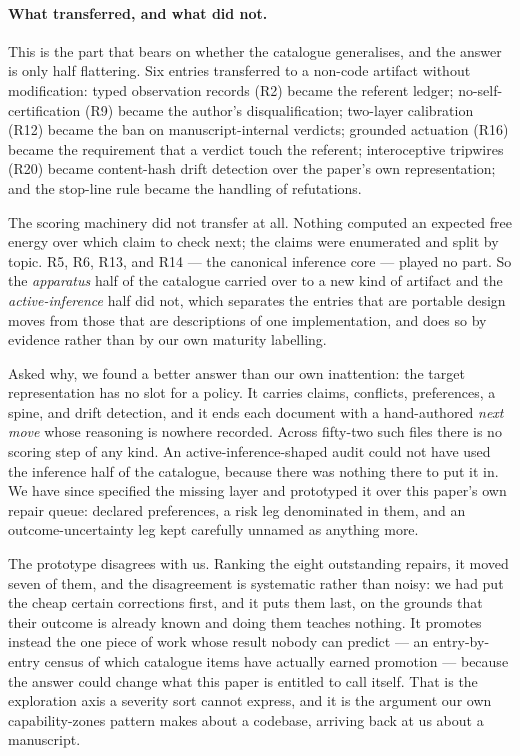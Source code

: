 \paragraph{What transferred, and what did not.}  This is the part that bears on
whether the catalogue generalises, and the answer is only half flattering.  Six
entries transferred to a non-code artifact without modification: typed
observation records (R2) became the referent ledger; no-self-certification (R9)
became the author's disqualification; two-layer calibration (R12) became the ban
on manuscript-internal verdicts; grounded actuation (R16) became the requirement
that a verdict touch the referent; interoceptive tripwires (R20) became content-hash
drift detection over the paper's own representation; and the stop-line rule
became the handling of refutations.

The scoring machinery did not transfer at all.  Nothing computed an expected
free energy over which claim to check next; the claims were enumerated and split
by topic.  R5, R6, R13, and R14 --- the canonical inference core --- played no
part.  So the \emph{apparatus} half of the catalogue carried over to a new kind
of artifact and the \emph{active-inference} half did not, which separates the
entries that are portable design moves from those that are descriptions of one
implementation, and does so by evidence rather than by our own maturity
labelling.

Asked why, we found a better answer than our own inattention: the target
representation has no slot for a policy.  It carries claims, conflicts,
preferences, a spine, and drift detection, and it ends each document with a
hand-authored \emph{next move} whose reasoning is nowhere recorded.  Across
fifty-two such files there is no scoring step of any kind.  An
active-inference-shaped audit could not have used the inference half of the
catalogue, because there was nothing there to put it in.  We have since
specified the missing layer and prototyped it over this paper's own repair
queue: declared preferences, a risk leg denominated in them, and an
outcome-uncertainty leg kept carefully unnamed as anything more.

The prototype disagrees with us.  Ranking the eight outstanding repairs, it
moved seven of them, and the disagreement is systematic rather than noisy: we
had put the cheap certain corrections first, and it puts them last, on the
grounds that their outcome is already known and doing them teaches nothing.  It
promotes instead the one piece of work whose result nobody can predict --- an
entry-by-entry census of which catalogue items have actually earned promotion
--- because the answer could change what this paper is entitled to call itself.
That is the exploration axis a severity sort cannot express, and it is the
argument our own capability-zones pattern makes about a codebase, arriving back
at us about a manuscript.

